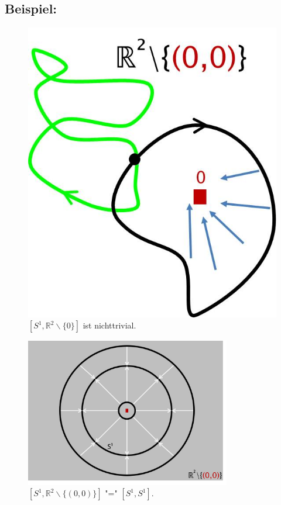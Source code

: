 \documentclass[a4paper,11pt,notitlepage]{report}
\newcommand{\R}{{\ensuremath{\mathbb{R}}}}
\newenvironment{bsp}[1]
{
\setlength{\fboxsep}{10pt}
\subsection*{Beispiel: #1}
\begin{upshape}
}
{
\end{upshape}
}
\begin{document}
\begin{bsp}{}
\begin{figure}[h]
\centering
\includegraphics[scale=0.4]{images/Homotop_Schleifen_R_ohne_0.jpg}
\caption{$[S^1, \R^2 \backslash \{0\}]$ ist nichttrivial.}
\end{figure}
\end{bsp}

\begin{figure}[h]
\centering
\includegraphics[width=0.8\textwidth]{images/S1_und_R2_ohne_0.jpg}
\caption{$[S^1,\R^2\backslash\{(0,0)\}]\text{ "=" }[S^1,S^1]$.}
\end{figure}
\end{document}
